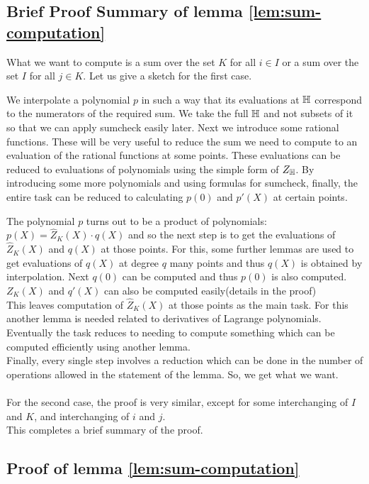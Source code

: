 \subsection{Brief Proof Summary of lemma \ref{lem:sum-computation}}
What we want to compute is a sum over the set $K$ for all $i \in I$ or a sum over the set $I$ for all $j \in K$. Let us give a sketch for the first case.

We interpolate a polynomial $p$ in such a way that its evaluations at $\mathbb{H}$ correspond to the numerators of the required sum. We take the full $\mathbb{H}$ and not subsets of it so that we can apply sumcheck easily later.
Next we introduce some rational functions. These will be very useful to reduce the sum we need to compute to an evaluation of the rational functions at some points.
These evaluations can be reduced to evaluations of polynomials using the simple form of $Z_{\mathbb{H}}$. By introducing some more polynomials and using formulas for sumcheck, finally, the entire task can be reduced to calculating $p(0)$ and $p'(X)$ at certain points.

The polynomial $p$ turns out to be a product of polynomials: $p(X)=\widehat{Z}_K(X)\cdot q(X)$ and so the next step is to get the evaluations of $\widehat{Z}_K(X)$ and $q(X)$ at those points.
For this, some further lemmas are used to get evaluations of $q(X)$ at degree $q$ many points and thus $q(X)$ is obtained by interpolation.
Next $q(0)$ can be computed and thus $p(0)$ is also computed.
$Z_K(X)$ and $q'(X)$ can also be computed easily(details in the proof)\\
This leaves computation of $\widehat{Z}_K(X)$ at those points as the main task. For this another lemma is needed related to derivatives of Lagrange polynomials.
Eventually the task reduces to needing to compute something which can be computed efficiently using another lemma.\\
Finally, every single step involves a reduction which can be done in the number of operations allowed in the statement of the lemma. So, we get what we want.\\\\
For the second case, the proof is very similar, except for some interchanging of $I$ and $K$, and interchanging of $i$ and $j$. \\
This completes a brief summary of the proof.
\subsection{Proof of lemma \ref{lem:sum-computation}}

